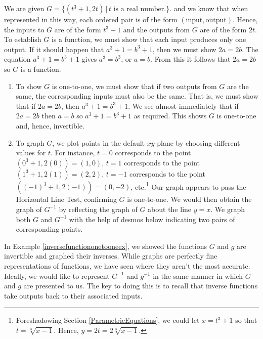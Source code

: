 \documentclass{ximera}
\begin{document}
\begin{example}
\begin{explanation}
\begin{enumerate}
We are given  $G = \{ (t^3+1, 2t) \, | \, \text{$t$ is a real number.} \}$. and we know that when represented in this way, each ordered pair is of the form $(\text{input}, \text{output})$.  Hence, the inputs to $G$ are of the form $t^3+1$ and the outputs from $G$ are of the form $2t$.  To establish $G$ is a function, we must show that each input produces only one output.  If it should happen that $a^3+1 = b^3+1$, then we must show $2a = 2b$.  The equation $a^3+1 = b^3+1$ gives $a^3=b^3$, or  $a=b$. From this it follows that $2a=2b$ so $G$ is a function.

\begin{enumerate}

\item To show $G$ is one-to-one, we must show that if two outputs from $G$ are the same, the corresponding inputs must also be the same.  That is, we must show that if $2a=2b$, then $a^3+1 = b^3+1$.  We see almost immediately that if $2a=2b$ then $a=b$ so $a^3+1 = b^3+1$ as required.  This shows $G$ is one-to-one and, hence,  invertible.


\item To graph $G$, we plot points in the default $xy$-plane by choosing different values for $t$.  For instance, $t=0$ corresponds to the point $(0^3+1, 2(0)) = (1,0)$, $t=1$ corresponds to the point $(1^3+1, 2(1)) = (2,2)$, $t=-1$ corresponds to the point $((-1)^3+1, 2(-1)) = (0, -2)$, etc.\footnote{Foreshadowing Section \ref{ParametricEquations}, we  could let $x= t^3+1$ so that $t = \sqrt[3]{x-1}$.  Hence, $y = 2t =  2\sqrt[3]{x-1}$.} Our graph appears to pass the Horizontal Line Test, confirming $G$ is one-to-one.  We would then obtain the graph of $G^{-1}$  by reflecting the graph of $G$ about the line $y=x$.  We graph both $G$ and $G^{-1}$ with the help of desmos below indicating two pairs of corresponding points.


\end{enumerate}


\end{enumerate}

\begin{center}
\end{center}

\end{explanation}
\end{example}

 In Example \ref{inversefunctiononetooneex}, we showed the functions $G$ and  $g$ are invertible and graphed their inverses.  While graphs are perfectly fine representations of functions, we have seen where they aren't the most accurate.  Ideally, we would like to represent $G^{-1}$ and $g^{-1}$ in the same manner in which $G$ and $g$ are presented to us.  The key to doing this is to recall that inverse functions take outputs back to their associated inputs.
 
\end{document}
